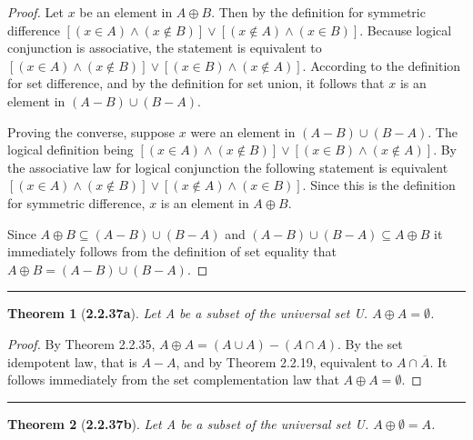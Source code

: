 \documentclass[a4paper, 12pt]{article}
\theoremstyle{plain}
\newtheorem*{theorem*}{Theorem}
\begin{document}
\begin{proof}
    Let $x$ be an element in $A \oplus B$. Then by the definition for symmetric 
    \newline difference $[(x \in A) \land (x \notin B)] \lor [(x \notin A) \land (x \in B)]$. 
    Because logical \newline conjunction is associative, the statement is equivalent to 
    \newline $[(x \in A) \land (x \notin B)] \lor [(x \in B) \land (x \notin A)]$. According 
    to the definition for set difference, and by the definition for set union, it follows 
    that $x$ is an element in $(A - B) \cup (B - A)$.
    
    Proving the converse, suppose $x$ were an element in $(A - B) \cup (B - A)$. The logical 
    definition being $[(x \in A) \land (x \notin B)] \lor [(x \in B) \land (x \notin A)]$. 
    By the associative law for logical conjunction the following statement is equivalent 
    $[(x \in A) \land (x \notin B)] \lor [(x \notin A) \land (x \in B)]$. Since this is the 
    definition for symmetric difference, $x$ is an element in $A \oplus B$.
    
    Since $A \oplus B \subseteq (A - B) \cup (B - A)$ and 
    $(A - B) \cup (B - A) \subseteq A \oplus B$ it immediately follows from the definition of 
    set equality that \newline $A \oplus B = (A - B) \cup (B - A)$.
\end{proof}
\begin{center}
    \rule{5.4in}{1pt}
\end{center}


\begin{theorem*}[\textbf{2.2.37a}]
    Let A be a subset of the universal set U. $A \oplus A = \emptyset$.
\end{theorem*}

\begin{proof}
    By Theorem 2.2.35, $A \oplus A = (A \cup A) - (A \cap A)$. By the set idempotent law, 
    that is $A - A$, and by Theorem 2.2.19, equivalent to $A \cap \overline{A}$. It follows 
    immediately from the set complementation law that $A \oplus A = \emptyset$.
\end{proof}
\begin{center}
    \rule{5.4in}{1pt}
\end{center}


\begin{theorem*}[\textbf{2.2.37b}]
    Let A be a subset of the universal set U. $A \oplus \emptyset = A$.
\end{theorem*}
\end{document}
